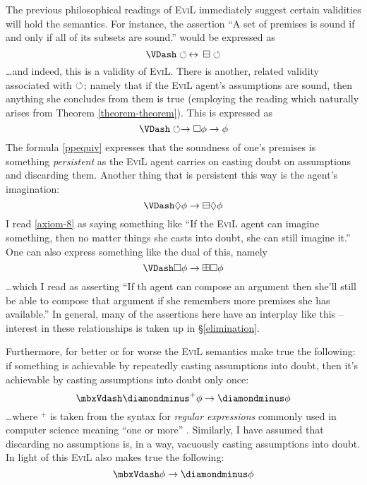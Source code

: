 The previous philosophical readings of \textsc{EviL} immediately
suggest certain validities will hold the semantics.  For instance, the
assertion ``A set of premises is sound if and only if all of its
subsets are sound.'' would be expressed as
\begin{equation}
\VDash \PP \IFF \BM \PP \label{ppequiv}
\end{equation}
\ldots and indeed, this is a validity of \textsc{EviL}.  There is
another, related validity associated with $\circlearrowleft$; namely that if the
\textsc{EviL} agent's assumptions are sound, then anything she
concludes from them is true (employing the reading which naturally
arises from Theorem \ref{theorem-theorem}).  This is expressed as
\begin{equation}
\VDash \PP \to \Box \phi \to \phi \label{axiom-11}
\end{equation}
The formula \eqref{ppequiv} expresses that the soundness of one's
premises  is something \emph{persistent} as the \textsc{EviL} agent
carries on casting doubt on assumptions and discarding them.  Another
thing that is persistent this way is the  agent's
imagination:
\begin{equation}
\VDash \Pos \phi \to \BM \Pos \phi \label{axiom-8}
\end{equation}
I read \eqref{axiom-8} as saying something like ``If the \textsc{EviL}
agent can imagine something, then no matter things she casts into
doubt, she can still imagine it.''  One can also express something
like the dual of this, namely
\begin{equation}
\VDash \Box \phi \to \BP \Box \phi
\end{equation}
\ldots which I read as asserting ``If th agent can compose an argument
then she'll still be able to compose that argument if she remembers
more premises she has available.''  In general, many of the assertions
here have an interplay like this -- interest in these relationships is
taken up in \S\ref{elimination}.

Furthermore, for better or for worse the \textsc{EviL} semantics make
true the following: if something is achievable by repeatedly casting
assumptions into doubt, then it's achievable by casting assumptions
into doubt only once:
\begin{equation}
\Vdash \PM^+\phi \to \PM \phi
\end{equation}
\ldots where $^+$ is taken from the syntax for \emph{regular
  expressions} commonly used in computer science meaning ``one or
more'' \citep{friedl_mastering_2006}.  Similarly, I have assumed that
discarding no assumptions is, in a way, vacuously casting assumptions
into doubt.  In light of this \textsc{EviL} also makes true the following:
\begin{equation}
\Vdash \phi \to \PM \phi
\end{equation}
